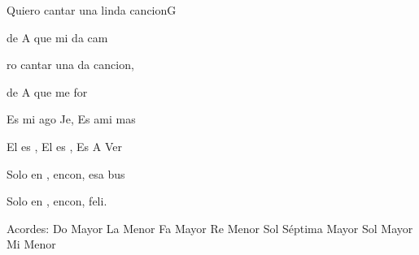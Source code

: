 \documentclass[12pt, spanish]{book}
\begin{document}
\begin{song}{Quiero cantar una linda cancion}{G}
\begin{SBExtraKeys}
{\begin{SBOpGroup}
                de A que mi da cam

                ro cantar una da cancion,

                de A que me for
            \end{SBOpGroup}

            \begin{SBChorus}
                Es mi ago Je, Es  ami mas 

                El es , El es , Es A  Ver

                Solo en , encon, esa   bus

                Solo en , encon,  feli.
            \end{SBChorus}

            \ifChordBk
            \begin{SBOpGroup}
                Acordes:
                \upchord{\C}\qquad Do Mayor \hfill
                \upchord{\Am}\qquad La Menor \hfill\null\break
                \upchord{\F}\qquad Fa Mayor \hfill
                \upchord{\Dm}Re Menor \hfill\null\break
                \upchord{\Gseven}\qquad Sol S\'eptima Mayor \hfill
                \upchord{\G}\qquad Sol Mayor \hfill\null\break
                \upchord{\Em}Mi Menor \hfill\null\break
            \end{SBOpGroup}
            \fi
        }\end{SBExtraKeys}
    \end{song}
\end{document}
